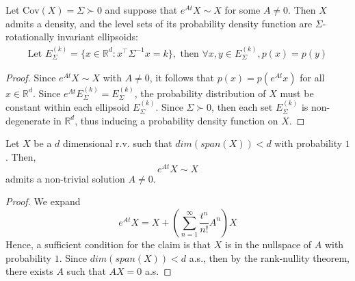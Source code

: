 \documentclass[twoside,11pt]{article}
\newcommand{\R} {\mathbb R}
\newcommand{\cov} {\mathrm{Cov}}
\begin{document}



\begin{lemma}
\label{lemma:level_sets}
Let $\cov(X) = \Sigma \succ 0$ and suppose that $e^{At}X \sim X$ for some $A \neq 0$. Then $X$ admits a density, and the level sets of its probability density function are $\Sigma$-rotationally invariant ellipsoids:
\begin{align}\text{Let } E_\Sigma^{(k)} =\{x \in \R^d: x^\top \Sigma^{-1}x = k \}, \text{ then } \forall x,y \in E_\Sigma^{(k)}, p(x) = p(y) \label{ellipsoid_level_set}\end{align}
\end{lemma}
\begin{proof}
Since $e^{At}X \sim X$ with $A \neq 0$, it follows that $p(x) = p(e^{At}x)$ for all $x \in \R^d$. Since $e^{At}E_\Sigma^{(k)} = E_\Sigma^{(k)}$, the probability distribution of $X$ must be constant within each ellipsoid $E_\Sigma^{(k)}$.  Since $\Sigma \succ 0$, then each set $E_\Sigma^{(k)}$ is non-degenerate in $\R^d$, thus inducing  a probability density function on $X$.
\end{proof}






\begin{lemma}
Let $X$ be a $d$ dimensional r.v. such that $dim(span(X)) < d$ with probability $1$. Then, 
$$
e^{At}X \sim X
$$
admits a non-trivial solution $A \neq 0$.
\label{lemma: degenerate_X_isotropy}
\end{lemma}
\begin{proof}
We expand
$$
e^{At}X = X + \left(\sum_{n=1}^{\infty}\frac{t^n}{n!}A^n \right)X
$$
Hence, a sufficient condition for the claim is that $X$ is in the nullspace of $A$ with probability $1$. Since $dim(span(X))<d$ a.s., then by the rank-nullity theorem, there exists $A$ such that $AX = 0$ a.s.
\end{proof}
\end{document}
